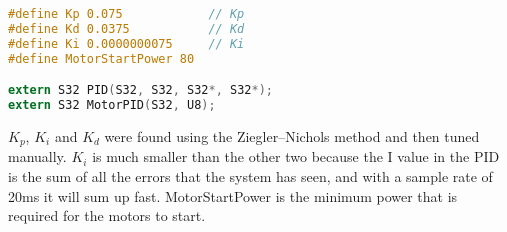 \begin{lstlisting}[language=C, label={PID.h}, caption={PID.h}]
#define Kp 0.075            // Kp
#define Kd 0.0375           // Kd
#define Ki 0.0000000075     // Ki
#define MotorStartPower 80

extern S32 PID(S32, S32, S32*, S32*);
extern S32 MotorPID(S32, U8);
\end{lstlisting}

$K_p$, $K_i$ and $K_d$ were found using the Ziegler–Nichols method and then tuned manually. $K_i$ is much smaller than the other two because the I value in the PID is the sum of all the errors that the system has seen, and with a sample rate of 20ms it will sum up fast. MotorStartPower is the minimum power that is required for the motors to start.